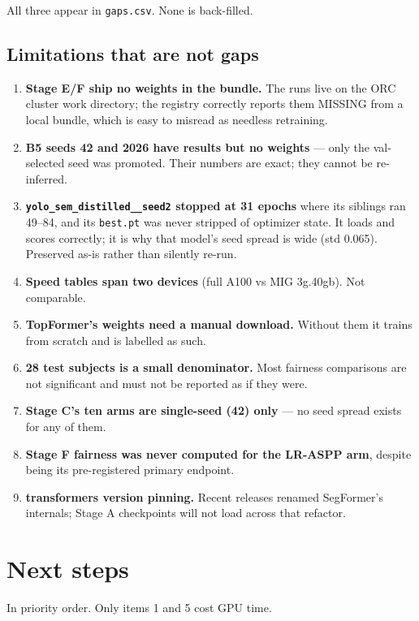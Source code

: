 \documentclass[11pt]{article}
\begin{document}
All three appear in \texttt{gaps.csv}. None is back-filled.

\subsection{Limitations that are not gaps}
\begin{enumerate}[leftmargin=*,itemsep=2pt,start=4]
\item \textbf{Stage E/F ship no weights in the bundle.} The runs live on the ORC
cluster work directory; the registry correctly reports them MISSING from a local
bundle, which is easy to misread as needless retraining.
\item \textbf{B5 seeds 42 and 2026 have results but no weights} --- only the
val-selected seed was promoted. Their numbers are exact; they cannot be
re-inferred.
\item \textbf{\texttt{yolo\_sem\_distilled\_\_seed2} stopped at 31 epochs} where
its siblings ran 49--84, and its \texttt{best.pt} was never stripped of optimizer
state. It loads and scores correctly; it is why that model's seed spread is wide
(std 0.065). Preserved as-is rather than silently re-run.
\item \textbf{Speed tables span two devices} (full A100 vs MIG 3g.40gb). Not
comparable.
\item \textbf{TopFormer's weights need a manual download.} Without them it trains
from scratch and is labelled as such.
\item \textbf{28 test subjects is a small denominator.} Most fairness comparisons
are not significant and must not be reported as if they were.
\item \textbf{Stage C's ten arms are single-seed (42) only} --- no seed spread
exists for any of them.
\item \textbf{Stage F fairness was never computed for the LR-ASPP arm}, despite
being its pre-registered primary endpoint.
\item \textbf{transformers version pinning.} Recent releases renamed SegFormer's
internals; Stage A checkpoints will not load across that refactor.
\end{enumerate}

\section{Next steps}
\label{sec:next}

In priority order. Only items 1 and 5 cost GPU time.
\end{document}
